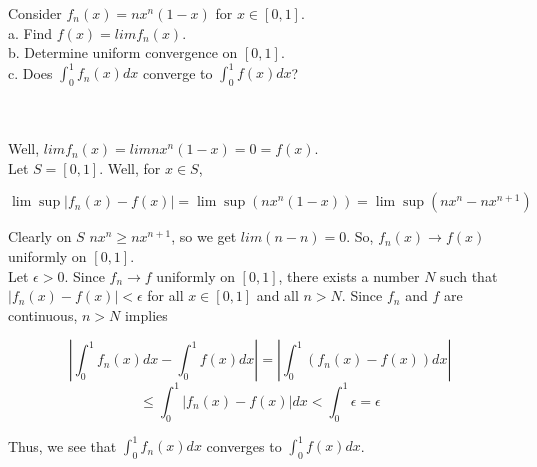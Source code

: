Consider $f_n(x)=nx^n(1-x)$ for $x\in[0,1]$.\\

a. Find $f(x) = limf_n(x)$.\\

b. Determine uniform convergence on $[0,1]$.\\

c. Does $\int_{0}^{1}f_n(x)dx$ converge to $\int_{0}^{1}f(x)dx$?\\\\

\begin{solution}\renewcommand{\qedsymbol}{}\ \\
    Well, $limf_n(x)=lim nx^n(1-x)=0=f(x)$.\\

    Let $S=[0,1]$. Well, for $x\in S$,
    
    $$\lim\sup|f_n(x)-f(x)|=\lim\sup(nx^n(1-x))=\lim\sup(nx^n-nx^{n+1})$$
    
    Clearly on $S$ $nx^n\geq nx^{n+1}$, so we get $lim(n-n)=0$. So, $f_n(x)\rightarrow f(x)$ uniformly
    on $[0,1]$.\\

    Let $\epsilon>0$. Since $f_n\rightarrow f$ uniformly on $[0,1]$, there exists a number $N$ such that
    $|f_n(x)- f(x)|<\epsilon$ for all $x\in[0,1]$ and all $n>N$. Since $f_n$ and $f$ are continuous,
    $n>N$ implies
    
    $$|\int_{0}^{1}f_n(x)dx-\int_{0}^{1}f(x)dx|=|\int_{0}^{1}(f_n(x)-f(x))dx|$$
    $$\leq\int_{0}^{1}|f_n(x)-f(x)|dx<\int_{0}^{1}\epsilon=\epsilon$$
    
    Thus, we see that $\int_{0}^{1}f_n(x)dx$ converges to $\int_{0}^{1}f(x)dx$.

\end{solution}